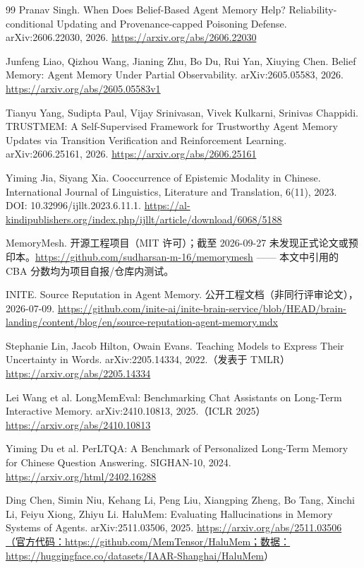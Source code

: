 \documentclass{article}
\begin{document}
\begin{thebibliography}{99}
 Pranav Singh. When Does Belief-Based Agent Memory Help? Reliability-conditional Updating and Provenance-capped Poisoning Defense. arXiv:2606.22030, 2026. \url{https://arxiv.org/abs/2606.22030}

 Junfeng Liao, Qizhou Wang, Jianing Zhu, Bo Du, Rui Yan, Xiuying Chen. Belief Memory: Agent Memory Under Partial Observability. arXiv:2605.05583, 2026. \url{https://arxiv.org/abs/2605.05583v1}

 Tianyu Yang, Sudipta Paul, Vijay Srinivasan, Vivek Kulkarni, Srinivas Chappidi. TRUSTMEM: A Self-Supervised Framework for Trustworthy Agent Memory Updates via Transition Verification and Reinforcement Learning. arXiv:2606.25161, 2026. \url{https://arxiv.org/abs/2606.25161}

 Yiming Jia, Siyang Xia. Cooccurrence of Epistemic Modality in Chinese. International Journal of Linguistics, Literature and Translation, 6(11), 2023. DOI: 10.32996/ijllt.2023.6.11.1. \url{https://al-kindipublishers.org/index.php/ijllt/article/download/6068/5188}

 MemoryMesh. 开源工程项目（MIT 许可）；截至 2026-09-27 未发现正式论文或预印本。\url{https://github.com/sudharsan-m-16/memorymesh} —— 本文中引用的 CBA 分数均为项目自报/仓库内测试。

 INITE. Source Reputation in Agent Memory. 公开工程文档（非同行评审论文），2026-07-09. \url{https://github.com/inite-ai/inite-brain-service/blob/HEAD/brain-landing/content/blog/en/source-reputation-agent-memory.mdx}

 Stephanie Lin, Jacob Hilton, Owain Evans. Teaching Models to Express Their Uncertainty in Words. arXiv:2205.14334, 2022.（发表于 TMLR）\url{https://arxiv.org/abs/2205.14334}

 Lei Wang et al. LongMemEval: Benchmarking Chat Assistants on Long-Term Interactive Memory. arXiv:2410.10813, 2025.（ICLR 2025）\url{https://arxiv.org/abs/2410.10813}

 Yiming Du et al. PerLTQA: A Benchmark of Personalized Long-Term Memory for Chinese Question Answering. SIGHAN-10, 2024. \url{https://arxiv.org/html/2402.16288}

 Ding Chen, Simin Niu, Kehang Li, Peng Liu, Xiangping Zheng, Bo Tang, Xinchi Li, Feiyu Xiong, Zhiyu Li. HaluMem: Evaluating Hallucinations in Memory Systems of Agents. arXiv:2511.03506, 2025. \url{https://arxiv.org/abs/2511.03506（官方代码：https://github.com/MemTensor/HaluMem；数据：https://huggingface.co/datasets/IAAR-Shanghai/HaluMem}）


\end{thebibliography}
\end{document}
